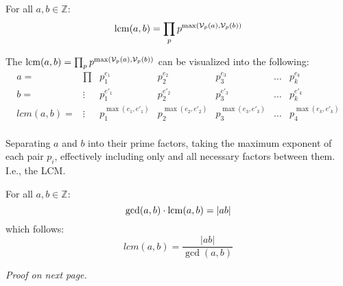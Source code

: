 \newpage

\begin{theo}

    \label{theo:LCM_abstracted}

    For all $a,b\in\mathbb{Z}$:
    \[\operatorname{lcm}(a,b) = \prod_{p} p^{\max(\mathcal{V}_p(a),\mathcal{V}_p(b))}\]
\end{theo}

\begin{Proof}

    \label{proof:lcm_abstracted}

    The $\operatorname{lcm}(a,b) = \prod_{p} p^{\max(\mathcal{V}_p(a),\mathcal{V}_p(b))}$ can be visualized into the following:
    \[
    \begin{array}{ccc|c|c|c|c}
    
    a=&\prod&p_1^{e_1} & p_2^{e_2} & p_3^{e_3} & \dots & p_k^{e_k} \\
    b=&\vdots&p_1^{e'_1} & p_2^{e'_2} & p_3^{e'_3} & \dots & p_k^{e'_k} \\
    \hline
    lcm(a,b)=&\vdots&p_1^{\max(e_1, e'_1)} & p_2^{\max(e_2, e'_2)} & p_3^{\max(e_3, e'_3)} & \dots & p_4^{\max(e_k, e'_k)} \\

    \end{array}
    \]

    \noindent
    Separating $a$ and $b$ into their prime factors, taking the maximum exponent of each pair $p_i$,
    effectively including only and all necessary factors between them.\\
    
    \noindent
    I.e., the LCM.
\end{Proof}

\begin{theo}

    \label{theo:gcd_lcm_relationship}

    For all $a,b\in\mathbb{Z}$:
    \[\gcd(a,b)\cdot\operatorname{lcm}(a,b) = |ab|\]
    which follows:
    \LARGE \[lcm(a,b) = \dfrac{|ab|}{\gcd(a,b)}\]
\end{theo}

\begin{center}
    \textit{Proof on next page.}
\end{center}

\newpage

